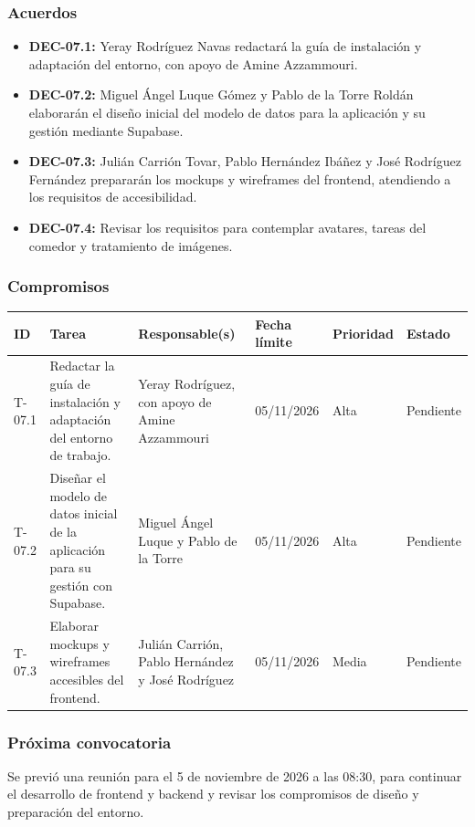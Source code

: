 \subsubsection{Acuerdos}
\begin{itemize}[leftmargin=*]
  \item \textbf{DEC-07.1:} Yeray Rodríguez Navas redactará la guía de instalación y adaptación del entorno, con apoyo de Amine Azzammouri.
  \item \textbf{DEC-07.2:} Miguel Ángel Luque Gómez y Pablo de la Torre Roldán elaborarán el diseño inicial del modelo de datos para la aplicación y su gestión mediante Supabase.
  \item \textbf{DEC-07.3:} Julián Carrión Tovar, Pablo Hernández Ibáñez y José Rodríguez Fernández prepararán los mockups y wireframes del frontend, atendiendo a los requisitos de accesibilidad.
  \item \textbf{DEC-07.4:} Revisar los requisitos para contemplar avatares, tareas del comedor y tratamiento de imágenes.
\end{itemize}

\subsubsection{Compromisos}
\begin{center}\footnotesize
\begin{tabularx}{\textwidth}{@{}p{}X p{}p{}p{}p{}@{}}
\toprule
\rowcolor{tableHeader} ID & Tarea & Responsable(s) & Fecha límite & Prioridad & Estado \\
\midrule
T-07.1 & Redactar la guía de instalación y adaptación del entorno de trabajo. & Yeray Rodríguez, con apoyo de Amine Azzammouri & 05/11/2026 & Alta & Pendiente \\
T-07.2 & Diseñar el modelo de datos inicial de la aplicación para su gestión con Supabase. & Miguel Ángel Luque y Pablo de la Torre & 05/11/2026 & Alta & Pendiente \\
T-07.3 & Elaborar mockups y wireframes accesibles del frontend. & Julián Carrión, Pablo Hernández y José Rodríguez & 05/11/2026 & Media & Pendiente \\
\bottomrule
\end{tabularx}
\end{center}

\subsubsection{Próxima convocatoria}
Se previó una reunión para el 5 de noviembre de 2026 a las 08:30, para continuar el desarrollo de frontend y backend y revisar los compromisos de diseño y preparación del entorno.

